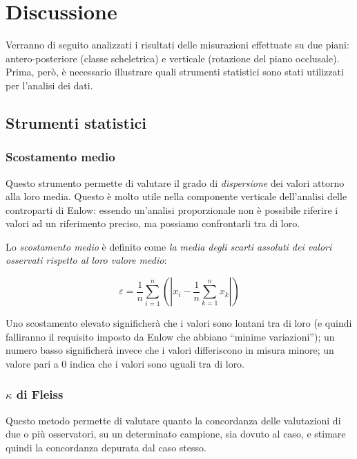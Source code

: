 \chapter{Discussione}
Verranno di seguito analizzati i risultati delle misurazioni effettuate su due piani:  antero-posteriore (classe scheletrica) e verticale (rotazione del piano occlusale). Prima, però, è necessario illustrare quali strumenti statistici sono stati utilizzati per l'analisi dei dati.

\section{Strumenti statistici}
\subsection{Scostamento medio}
\label{scostamento_medio}
Questo strumento permette di valutare il grado di \emph{dispersione} dei valori attorno alla loro media. Questo è molto utile nella componente verticale dell'analisi delle controparti di Enlow: essendo un'analisi proporzionale non è possibile riferire i valori ad un riferimento preciso, ma possiamo confrontarli tra di loro.

Lo \emph{scostamento medio} è definito come \emph{la media degli scarti assoluti dei valori osservati rispetto al loro valore medio}:

\begin{equation}
\label{eq:scostamento_medio}
\varepsilon = \frac{1}{n}\sum_{i=1}^n{\left(\left|x_i - \frac{1}{n}\sum_{k=1}^n x_k\right|\right)}
\end{equation}

Uno scostamento elevato significherà che i valori sono lontani tra di loro (e quindi falliranno il requisito imposto da Enlow che abbiano ``minime variazioni''); un numero basso significherà invece che i valori differiscono in misura minore; un valore pari a 0 indica che i valori sono uguali tra di loro.

\subsection{$\kappa$ di Fleiss}
Questo metodo permette di valutare quanto la concordanza delle valutazioni di due o più osservatori, su un determinato campione, sia dovuto al caso, e stimare quindi la concordanza depurata dal caso stesso.


